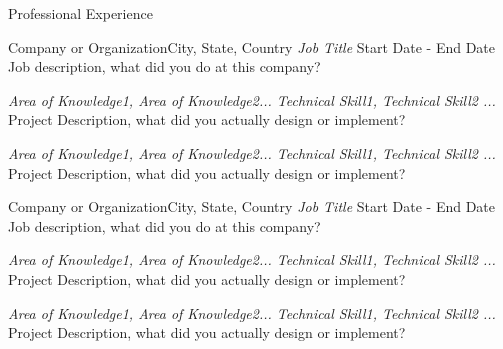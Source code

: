 \documentclass[10pt, letterpaper]{article}
\begin{document}
    \begin{profsection}{Professional Experience}
        \begin{profsubsection}{Company or Organization}{City, State, Country}
            \textit{Job Title} \normalsize \hfill Start Date - End Date \newline   
            Job description, what did you do at this company?

            \textit{Area of Knowledge1, Area of Knowledge2... \hfill Technical Skill1, Technical Skill2 ...} \newline
            Project Description, what did you actually design or implement?

            \textit{Area of Knowledge1, Area of Knowledge2... \hfill Technical Skill1, Technical Skill2 ...} \newline
            Project Description, what did you actually design or implement?
            
        \end{profsubsection}
        
        \begin{profsubsection}{Company or Organization}{City, State, Country}
            \textit{Job Title} \normalsize \hfill Start Date - End Date \newline   
            Job description, what did you do at this company?

            \textit{Area of Knowledge1, Area of Knowledge2... \hfill Technical Skill1, Technical Skill2 ...} \newline
            Project Description, what did you actually design or implement?

            \textit{Area of Knowledge1, Area of Knowledge2... \hfill Technical Skill1, Technical Skill2 ...} \newline
            Project Description, what did you actually design or implement?
            
        \end{profsubsection}
        
    \end{profsection}
\end{document}
